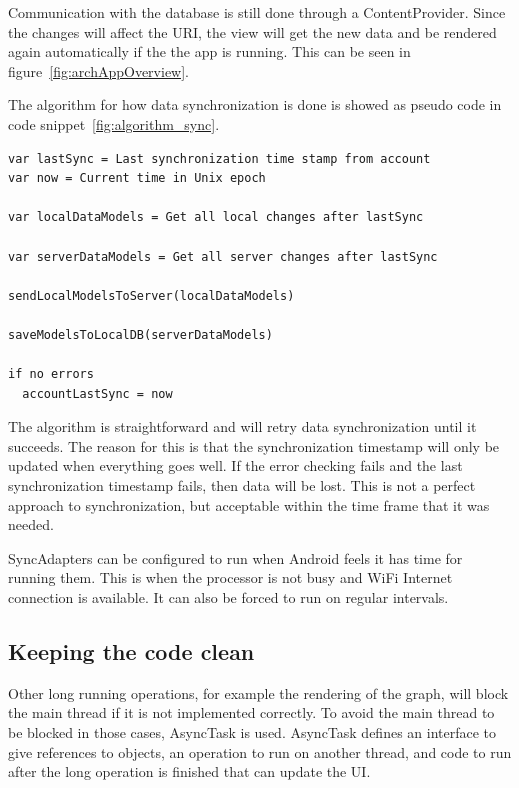 Communication with the database is still done through a ContentProvider. Since the changes will affect the URI, the view will get the new data and be rendered again automatically if the the app is running. This can be seen in figure~\ref{fig:archAppOverview}.

The algorithm for how data synchronization is done is showed as pseudo code in code snippet~\ref{fig:algorithm_sync}.


\noindent\begin{minipage}{\textwidth}
\begin{lstlisting}[caption={Algorithm for the synchronization flow.}, label={fig:algorithm_sync}]
var lastSync = Last synchronization time stamp from account
var now = Current time in Unix epoch

var localDataModels = Get all local changes after lastSync

var serverDataModels = Get all server changes after lastSync

sendLocalModelsToServer(localDataModels)

saveModelsToLocalDB(serverDataModels)

if no errors
  accountLastSync = now
\end{lstlisting}
\end{minipage}

The algorithm is straightforward and will retry data synchronization until it succeeds. The reason for this is that the synchronization timestamp will only be updated when everything goes well. If the error checking fails and the last synchronization timestamp fails, then data will be lost. This is not a perfect approach to synchronization, but acceptable within the time frame that it was needed. 

SyncAdapters can be configured to run when Android feels it has time for running them. This is when the processor is not busy and WiFi Internet connection is available. It can also be forced to run on regular intervals.

\subsection{Keeping the code clean}
Other long running operations, for example the rendering of the graph, will block the main thread if it is not implemented correctly. To avoid the main thread to be blocked in those cases, AsyncTask is used. AsyncTask defines an interface to give references to objects, an operation to run on another thread, and code to run after the long operation is finished that can update the UI. 

